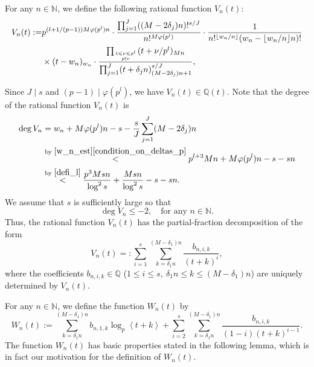 \documentclass[12pt]{article}
\numberwithin{equation}{section}
\begin{document}
\bigskip


For any $n \in \mathbb{N}$, we define the following rational function $V_n(t)$:
\begin{align}
	V_n(t) := & p^{(l+1/(p-1))M\varphi(p^{l})n} \cdot \frac{\prod_{j=1}^{J} ((M-2\delta_j)n)!^{s/J}}{n!^{M\varphi(p^{l})}} \cdot \frac{1}{n!^{\lfloor w_n / n\rfloor}(w_n-\lfloor w_n / n\rfloor n)!} \notag \\
	& \times (t-w_n)_{w_n}  \cdot \frac{\prod_{1 \leqslant \nu \leqslant p^{l} \atop p \nmid \nu} (t+\nu/p^{l})_{Mn}}{\prod_{j=1}^{J} (t+\delta_j n)_{(M-2\delta_j)n+1}^{s/J}},  \label{defi_V_n(t)}
\end{align}

\medskip

Since $J \mid s$ and $(p-1) \mid \varphi(p^l)$, we have $V_n(t) \in \mathbb{Q}(t)$. Note that the degree of the rational function $V_n(t)$ is
\begin{align}
	\deg V_n &= w_n + M\varphi(p^{l})n -s - \frac{s}{J}\sum_{j=1}^{J} (M-2\delta_j)n \label{degVn}\\
	&\overset{\text{by~} \eqref{w_n_est}\eqref{condition_on_deltas_p}}{<} p^{l+3}Mn + M\varphi(p^{l})n -s - sn \notag\\
	&\overset{\text{by~} \eqref{defi_l}}{<}  \frac{p^3Msn}{\log^2 s} + \frac{Msn}{\log^2 s} - s - sn. \notag
\end{align}
We assume that $s$ is sufficiently large so that
\begin{equation}\label{degVnleq-2}
\deg V_n  \leqslant -2, \quad\text{for any~} n \in \mathbb{N}.
\end{equation}
Thus, the rational function $V_n(t)$ has the partial-fraction decomposition of the form
\begin{equation}\label{defi_bnik}
	V_n(t) =: \sum_{i=1}^{s}\sum_{k=\delta_1 n}^{(M-\delta_1)n} \frac{b_{n,i,k}}{(t+k)^i},
\end{equation} 
where the coefficients $b_{n,i,k} \in \mathbb{Q}$ ($1 \leqslant i \leqslant s,~\delta_1n \leqslant k \leqslant (M-\delta_1)n$) are uniquely determined by $V_n(t)$. 

For any $n \in \mathbb{N}$, we define the function $W_n(t)$ by
\begin{equation}\label{defi_W_n(t)}
	W_n(t) := \sum_{k=\delta_1 n}^{(M-\delta_1)n} b_{n,1,k} \log_p\left\langle t+k \right\rangle  + \sum_{i=2}^{s} \sum_{k=\delta_1 n}^{(M-\delta_1)n} \frac{b_{n,i,k}}{(1-i)(t+k)^{i-1}}.
\end{equation}
The function $W_n(t)$ has basic properties stated in the following lemma, which is in fact our motivation for the definition of $W_n(t)$.
\end{document}
